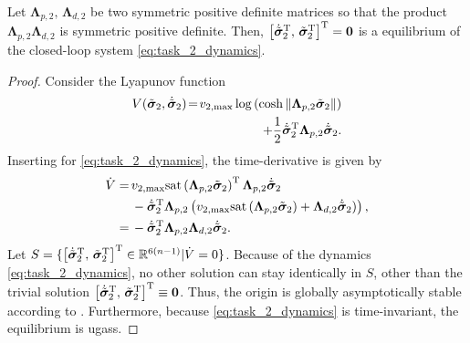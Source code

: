 \begin{theorem}
Let $\mathbf{\Lambda}_{p,2}, \, \mathbf{\Lambda}_{d,2}$ be two symmetric positive definite matrices so that the product $\mathbf{\Lambda}_{p,2} \mathbf{\Lambda}_{d,2}$ is symmetric positive definite. Then, $\bigl[\dot{\Tilde{\bm{\sigma}}}_2^{\mathrm{T}},\, \Tilde{\bm{\sigma}}_2^{\mathrm{T}}\bigr]^{\mathrm{T}} = \mathbf{0}$ is a  equilibrium of the closed-loop system \eqref{eq:task_2_dynamics}.
\end{theorem}

\begin{proof}
    Consider the Lyapunov function
    \begin{equation}
    \begin{split}
  V(\Tilde{\bm{\sigma}}_2, \dot{\Tilde{\bm{\sigma}}}_2) \!=\! v_{2,\max}\log\left(\cosh{\|\mathbf{\Lambda}_{p,2}\Tilde{\bm{\sigma}}_{2}\|}\right)\\+ \frac{1}{2}\dot{\Tilde{\bm{\sigma}}}_2^{\mathrm{T}}\mathbf{\Lambda}_{p,2}\dot{\Tilde{\bm{\sigma}}}_2.
  \end{split}
\end{equation}
Inserting for \eqref{eq:task_2_dynamics}, the time-derivative is given by
\begin{equation}
\begin{split}
    \dot{V} =\, & v_{2,\max}\mathrm{sat}\left(\mathbf{\Lambda}_{p,2}\Tilde{\bm{\sigma}}_{2}\right)^{\mathrm{T}} \mathbf{\Lambda}_{p,2} \dot{\Tilde{\bm{\sigma}}}_2 \\&-
    \dot{\Tilde{\bm{\sigma}}}_2^{\mathrm{T}} \mathbf{\Lambda}_{p,2}\left(v_{2,\max}\mathrm{sat}\left(\mathbf{\Lambda}_{p,2}\Tilde{\bm{\sigma}}_{2}\right) + \mathbf{\Lambda}_{d,2}\dot{\Tilde{\bm{\sigma}}}_2)\right),\\
    =\,&-\dot{\Tilde{\bm{\sigma}}}_2^{\mathrm{T}}\mathbf{\Lambda}_{p,2} \mathbf{\Lambda}_{d,2}\dot{\Tilde{\bm{\sigma}}}_2.
    \end{split}
\end{equation}
Let $S = \{\bigl[\dot{\Tilde{\bm{\sigma}}}_2^{\mathrm{T}},\, \Tilde{\bm{\sigma}}_2^{\mathrm{T}}\bigr]^{\mathrm{T}} \in \mathbb{R}^{6(n-1)} | \dot{V} = 0\}$. Because of the dynamics \eqref{eq:task_2_dynamics}, no other solution can stay identically in $S$, other than the trivial solution $\bigl[\dot{\Tilde{\bm{\sigma}}}_2^{\mathrm{T}},\, \Tilde{\bm{\sigma}}_2^{\mathrm{T}}\bigr]^{\mathrm{T}} \equiv \mathbf{0}$. Thus, the origin is globally asymptotically stable according to \cite[Corollary 4.2]{khalil_nonlinear_2002}. Furthermore, because \eqref{eq:task_2_dynamics} is time-invariant, the equilibrium is \glspl{ugas}.
\end{proof}


